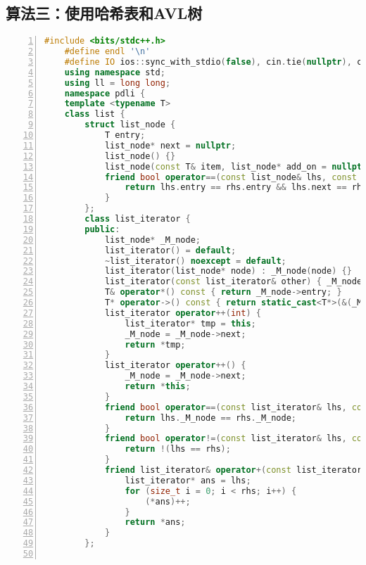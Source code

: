 \documentclass{article}
\begin{document}
\subsection{算法三：使用哈希表和AVL树}
\begin{lstlisting}[xleftmargin = 2em,xrightmargin = 2em, aboveskip = 0.5em, numbers = left, language = C++]
    #include <bits/stdc++.h>
    #define endl '\n'
    #define IO ios::sync_with_stdio(false), cin.tie(nullptr), cout.tie(nullptr)
    using namespace std;
    using ll = long long;
    namespace pdli {
    template <typename T>
    class list {
        struct list_node {
            T entry;
            list_node* next = nullptr;
            list_node() {}
            list_node(const T& item, list_node* add_on = nullptr) : entry(item), next(add_on) {}
            friend bool operator==(const list_node& lhs, const list_node& rhs) {
                return lhs.entry == rhs.entry && lhs.next == rhs.next;
            }
        };
        class list_iterator {
        public:
            list_node* _M_node;
            list_iterator() = default;
            ~list_iterator() noexcept = default;
            list_iterator(list_node* node) : _M_node(node) {}
            list_iterator(const list_iterator& other) { _M_node = other._M_node; }
            T& operator*() const { return _M_node->entry; }
            T* operator->() const { return static_cast<T*>(&(_M_node->entry)); }
            list_iterator operator++(int) {
                list_iterator* tmp = this;
                _M_node = _M_node->next;
                return *tmp;
            }
            list_iterator operator++() {
                _M_node = _M_node->next;
                return *this;
            }
            friend bool operator==(const list_iterator& lhs, const list_iterator& rhs) {
                return lhs._M_node == rhs._M_node;
            }
            friend bool operator!=(const list_iterator& lhs, const list_iterator& rhs) {
                return !(lhs == rhs);
            }
            friend list_iterator& operator+(const list_iterator& lhs, const size_t& rhs) {
                list_iterator* ans = lhs;
                for (size_t i = 0; i < rhs; i++) {
                    (*ans)++;
                }
                return *ans;
            }
        };


\end{lstlisting}
\end{document}
